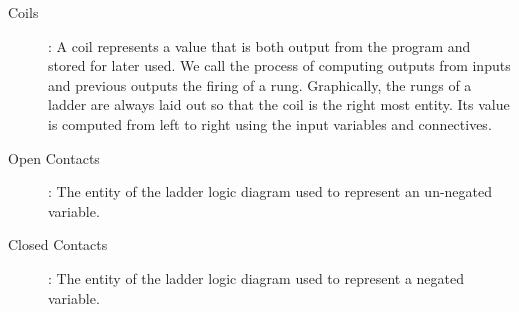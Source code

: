 \begin{comment}
The international standard for programmable logic controllers IEC
61131 \cite{IEC03} describes the graphical language ladder logic. It gets its
name from its graphical ``ladder'' like appearance which was chosen to suit
the control engineers responsible for their design. Each rung of the ladder is
used to compute an output variable from one or more input variables in the rung.
In the railway industry these input variables are referred to as contacts and
the output variables are referred to as coils. A description of the entities representing these variables
is as follows:
\end{comment}

\smallskip

\begin{description}

\item[Coils]: A coil represents a value that is both output from the program and stored for later used.  We call the process of computing outputs from inputs and previous outputs the firing of a rung. Graphically, the rungs of a ladder are always laid out so that the coil is the right most entity. Its value is computed from left to right using the input variables and connectives.

\item[Open Contacts]: The entity of the ladder logic diagram used to represent an un-negated variable.

\item[Closed Contacts]: The entity of the ladder logic diagram used to represent a negated variable.

\begin{comment}
\item[Coils]: These are used to represent values that are both stored for later use
  and output from the program. The value of a coil is calculated when a rung
  fires making use of the current set of inputs, the previous set of outputs
  and any outputs already computed for this cycle. The coil is always the
  right most entity of the rung and its value is computed by executing the
  rung from left to right.


\item[Open Contacts]: This entity represents the value of an un-negated variable


\item[Closed Contacts]: This entity represents the value of a negated variable.
\end{comment}
\end{description}

